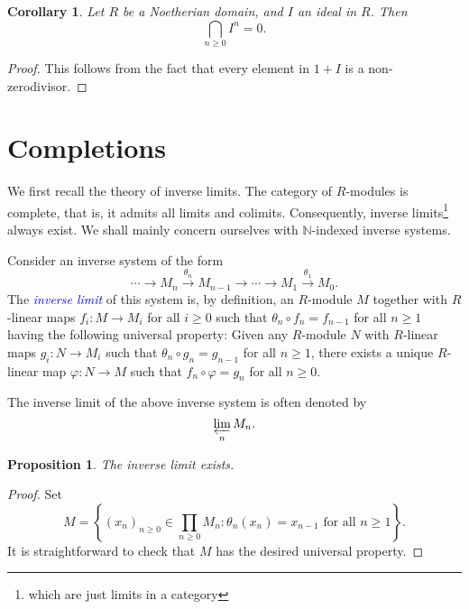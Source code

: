 \documentclass[11pt]{article}
\theoremstyle{thmstyle}
\newtheorem{proposition}[theorem]{Proposition}
\theoremstyle{defstyle}
\newtheorem{corollary}[theorem]{Corollary}
\newcommand{\N}{\mathbb{N}}
\newcommand{\define}[1]{\textcolor{blue}{\textit{#1}}}
\renewcommand{\ge}{\geqslant}
\begin{document}
\begin{corollary}
    Let $R$ be a Noetherian domain, and $I$ an ideal in $R$. Then 
    \begin{equation*}
        \bigcap_{n\ge 0} I^n = 0.
    \end{equation*}
\end{corollary}
\begin{proof}
    This follows from the fact that every element in $1 + I$ is a non-zerodivisor.
\end{proof}

\section{Completions}

We first recall the theory of inverse limits. The category of $R$-modules is complete, that is, it admits all limits and colimits. Consequently, inverse limits\footnote{which are just limits in a category} always exist. We shall mainly concern ourselves with $\N$-indexed inverse systems.

Consider an inverse system of the form 
\begin{equation*}
    \cdots\to M_n\xrightarrow{\theta_n} M_{n - 1}\to \cdots \to M_1\xrightarrow{\theta_1} M_0.
\end{equation*}
The \define{inverse limit} of this system is, by definition, an $R$-module $M$ together with $R$-linear maps $f_i\colon M\to M_i$ for all $i\ge 0$ such that $\theta_n\circ f_n = f_{n - 1}$ for all $n\ge 1$ having the following universal property: Given any $R$-module $N$ with $R$-linear maps $g_i\colon N\to M_i$ such that $\theta_n\circ g_n = g_{n - 1}$ for all $n\ge 1$, there exists a unique $R$-linear map $\varphi\colon N\to M$ such that $f_n\circ\varphi = g_n$ for all $n\ge 0$.

The inverse limit of the above inverse system is often denoted by 
\begin{equation*}
    \varprojlim_n M_n.
\end{equation*}

\begin{proposition}
    The inverse limit exists.
\end{proposition}
\begin{proof}
    Set 
    \begin{equation*}
        M = \left\{(x_n)_{n\ge 0}\in\prod_{n\ge 0} M_n\colon \theta_n(x_n) = x_{n - 1}\text{ for all }n\ge 1\right\}.
    \end{equation*}
    It is straightforward to check that $M$ has the desired universal property.
\end{proof}
\end{document}

